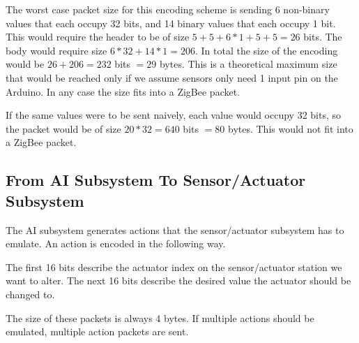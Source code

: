 The worst case packet size for this encoding scheme is sending 6 non-binary values that each occupy 32 bits, and 14 binary values that each occupy 1 bit. This would require the header to be of size $5 + 5 + 6 * 1 + 5 + 5 = 26$ bits. The body would require size $6 * 32 + 14 * 1 = 206$. In total the size of the encoding would be $26 + 206 = 232$ bits $= 29$ bytes. This is a theoretical maximum size that would be reached only if we assume sensors only need 1 input pin on the Arduino. In any case the size fits into a ZigBee packet.

If the same values were to be sent naively, each value would occupy 32 bits, so the packet would be of size $20 * 32 = 640$ bits $=80$ bytes. This would not fit into a ZigBee packet.

\subsection{From  AI Subsystem To Sensor/Actuator Subsystem}

The AI subsystem generates actions that the sensor/actuator subsystem has to emulate. An action is encoded in the following way.

The first 16 bits describe the actuator index on the sensor/actuator station we want to alter. The next 16 bits describe the desired value the actuator should be changed to.

The size of these packets is always 4 bytes. If multiple actions should be emulated, multiple action packets are sent.
